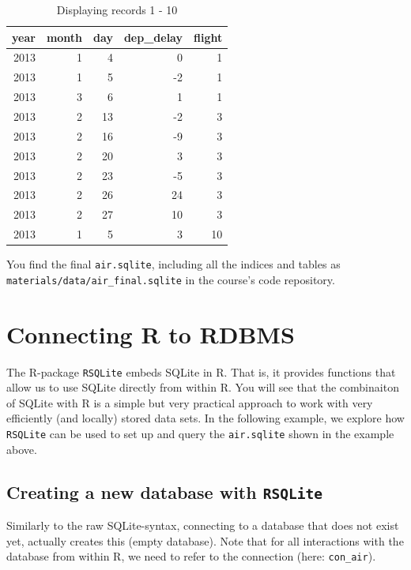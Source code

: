 \documentclass[
  12pt,
]{style/krantz}
\begin{document}
\begin{table}

\caption{\label{tab:unnamed-chunk-128}Displaying records 1 - 10}
\centering
\begin{tabular}[t]{r|r|r|r|r}
\hline
year & month & day & dep\_delay & flight\\
\hline
2013 & 1 & 4 & 0 & 1\\
\hline
2013 & 1 & 5 & -2 & 1\\
\hline
2013 & 3 & 6 & 1 & 1\\
\hline
2013 & 2 & 13 & -2 & 3\\
\hline
2013 & 2 & 16 & -9 & 3\\
\hline
2013 & 2 & 20 & 3 & 3\\
\hline
2013 & 2 & 23 & -5 & 3\\
\hline
2013 & 2 & 26 & 24 & 3\\
\hline
2013 & 2 & 27 & 10 & 3\\
\hline
2013 & 1 & 5 & 3 & 10\\
\hline
\end{tabular}
\end{table}

You find the final \texttt{air.sqlite}, including all the indices and tables as \texttt{materials/data/air\_final.sqlite} in the course's code repository.

\hypertarget{connecting-r-to-rdbms}{%
\section{Connecting R to RDBMS}\label{connecting-r-to-rdbms}}

The R-package \texttt{RSQLite} embeds SQLite in R. That is, it provides functions that allow us to use SQLite directly from within R. You will see that the combinaiton of SQLite with R is a simple but very practical approach to work with very efficiently (and locally) stored data sets. In the following example, we explore how \texttt{RSQLite} can be used to set up and query the \texttt{air.sqlite} shown in the example above.

\hypertarget{creating-a-new-database-with-rsqlite}{%
\subsection{\texorpdfstring{Creating a new database with \texttt{RSQLite}}{Creating a new database with RSQLite}}\label{creating-a-new-database-with-rsqlite}}

Similarly to the raw SQLite-syntax, connecting to a database that does not exist yet, actually creates this (empty database). Note that for all interactions with the database from within R, we need to refer to the connection (here: \texttt{con\_air}).
\end{document}
